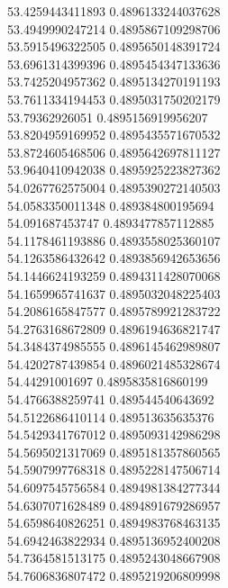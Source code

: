 {53.4259443411893 0.4896133244037628
 \\
53.4949990247214 0.4895867109298706
 \\
53.5915496322505 0.4895650148391724
 \\
53.6961314399396 0.4895454347133636
 \\
53.7425204957362 0.4895134270191193
 \\
53.7611334194453 0.4895031750202179
 \\
53.79362926051 0.4895156919956207
 \\
53.8204959169952 0.4895435571670532
 \\
53.8724605468506 0.4895642697811127
 \\
53.9640410942038 0.4895925223827362
 \\
54.0267762575004 0.4895390272140503
 \\
54.0583350011348 0.489384800195694
 \\
54.091687453747 0.4893477857112885
 \\
54.1178461193886 0.4893558025360107
 \\
54.1263586432642 0.4893856942653656
 \\
54.1446624193259 0.4894311428070068
 \\
54.1659965741637 0.4895032048225403
 \\
54.2086165847577 0.4895789921283722
 \\
54.2763168672809 0.4896194636821747
 \\
54.3484374985555 0.4896145462989807
 \\
54.4202787439854 0.4896021485328674
 \\
54.44291001697 0.4895835816860199
 \\
54.4766388259741 0.489544540643692
 \\
54.5122686410114 0.489513635635376
 \\
54.5429341767012 0.4895093142986298
 \\
54.5695021317069 0.4895181357860565
 \\
54.5907997768318 0.4895228147506714
 \\
54.6097545756584 0.4894981384277344
 \\
54.6307071628489 0.4894891679286957
 \\
54.6598640826251 0.4894983768463135
 \\
54.6942463822934 0.4895136952400208
 \\
54.7364581513175 0.4895243048667908
 \\
54.7606836807472 0.4895219206809998
 \\
}
